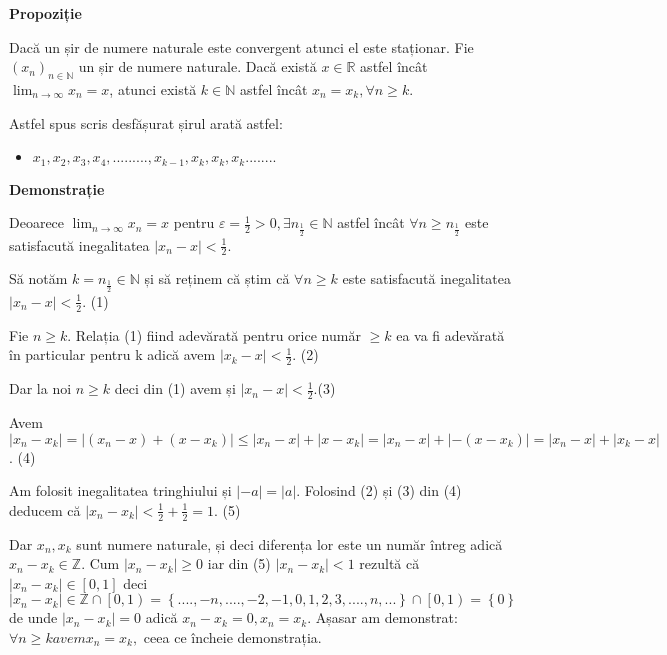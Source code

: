 \documentclass[a4paper,12pt,oneside]{report}
\begin{document}
\textbf{Propoziție}

Dacă un șir de numere naturale este convergent atunci el este staționar. 
Fie \((x_{n})_{n\in \mathbb{N}}\) un șir de numere naturale. Dacă există \(x\in \mathbb{R}\) astfel încât \(\lim_{n \to \infty }x_{n}= x\), atunci există \(k\in \mathbb{N}\) astfel încât \(x_{n}= x_{k}, \forall n\geq k\).
	
Astfel spus scris desfășurat șirul arată astfel:

\begin{itemize}
  \item \(x_{1},x_{2},x_{3},x_{4},.........,x_{k-1},x_{k},x_{k},x_{k}........\)
\end{itemize}


\textbf{Demonstrație}

Deoarece \(\lim_{n \to \infty }x_{n}= x\) pentru \(\varepsilon = \frac{1}{2}> 0, \exists n_{\frac{1}{2}}\in \mathbb{N}\) astfel încât \(\forall n\geq n_{\frac{1}{2}}\) este satisfacută inegalitatea \(\left | x_{n} -x \right |<  \frac{1}{2}\). 
	
Să notăm \(k=n_{\frac{1}{2}}\in \mathbb{N}\) și să reținem că știm că \(\forall n\geq k \) este satisfacută inegalitatea \(\left | x_{n} -x \right |< \frac{1}{2}\). (1) 

Fie \(n\geq k\). Relația (1) fiind adevărată pentru orice număr \(\geq k\) ea va fi adevărată în particular pentru k adică avem \(\left | x_{k}-x \right |< \frac{1}{2}\). (2)

Dar la noi \(n\geq k\) deci din (1) avem și \(\left | x_{n}-x \right |< \frac{1}{2}\).(3)

Avem \(\left | x_{n}-x_{k} \right |= \left | (x_{n}-x)+(x-x_{k}) \right |\leq \left | x_{n}-x \right |+\left | x-x_{k} \right |= \left | x_{n}-x \right |+ \left | -(x-x_{k}) \right |= \left | x_{n}-x \right |+ \left | x_{k} -x\right |\). (4)

Am folosit inegalitatea tringhiului și \(\left | -a \right |= \left | a \right |\). Folosind (2) și (3) din (4) deducem că \(\left | x_{n}-x_{k} \right |< \frac{1}{2}+ \frac{1}{2}= 1\). (5) 

Dar \(x_{n}, x_{k}\) sunt numere naturale, și deci diferența lor este un număr întreg adică \(x_{n}- x_{k}\in \mathbb{Z}\). Cum \(\left |x_{n}- x_{k} \right |\geq 0\) iar din (5) \(\left |x_{n}- x_{k} \right |< 1\) rezultă că \(\left |x_{n}- x_{k} \right |\in \left [ 0,1 \right ]\) deci \(\left |x_{n}- x_{k} \right |\in\mathbb{Z}\cap \left [ 0,1 \right)= \left \{ ....,-n ,....,-2,-1,0,1,2,3,....,n,... \right \}\cap \left [ 0,1 \right )= \left \{ 0 \right \}\) de unde \(\left | x_{n}-x_{k} \right |=0\) adică \(x_{n}-x_{k}=0,x_{n}=x_{k}.\) Așasar am demonstrat: \(\forall n\geq k avem x_{n}=x_{k},\) ceea ce încheie demonstrația. 










\setlength{\baselineskip}{\normalbaselineskip}
\setlength{\parskip}{0pt}

\end{document}
